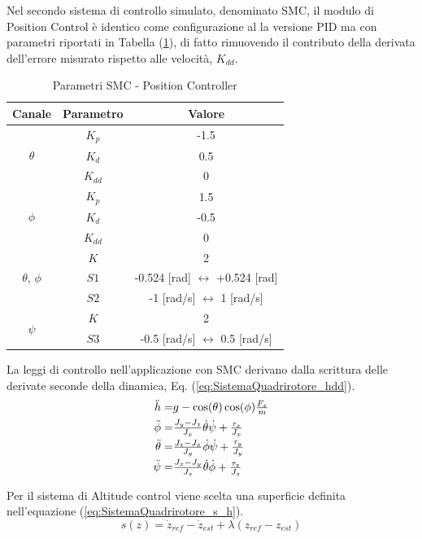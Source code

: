 Nel secondo sistema di controllo simulato, denominato SMC, il modulo di Position Control è identico come configurazione al la versione PID ma con parametri riportati in Tabella (\ref{tab:SMCPOS}), di fatto rimuovendo il contributo della derivata dell'errore misurato rispetto alle velocità, $K_{dd}$.

\begin{table}
	\centering
	\begin{tabular}{c c c}
		\hline
		Canale & Parametro & Valore \\
		\hline
		\multirow{3}{*}{$\theta$}&$K_p$ & -1.5 \\
		&$K_d$ & 0.5\\
		&$K_{dd}$ & 0\\
		\hline
		\multirow{3}{*}{$\phi$}& $K_p$ & 1.5 \\
		&$K_d$ & -0.5\\
		&$K_{dd}$ & 0\\
		\hline
		\multirow{3}{*}{$\theta$, $\phi$}&$K$ & 2 \\ 
		&$S1$ & -0.524 [rad] $\leftrightarrow$ +0.524 [rad]\\
		&$S2$ & -1 [rad/s] $\leftrightarrow$ 1  [rad/s]\\
		\hline
		\multirow{2}{*}{$\psi$}&$K$ & 2 \\
		&$S3$ & -0.5 [rad/s] $\leftrightarrow$ 0.5 [rad/s]\\
		\hline		
	\end{tabular}	
	\caption{Parametri SMC - Position Controller}
	\label{tab:SMCPOS}
\end{table}

La leggi di controllo nell'applicazione con SMC derivano dalla scrittura delle derivate seconde della dinamica, Eq. (\ref{eq:SistemaQuadrirotore_hdd}).
\begin{equation}\label{eq:SistemaQuadrirotore_hdd}
\begin{array}{r@{}l}
	\ddot{h} = & g -\cos(\theta)\cos(\phi)\frac{F_z}{m} \\[1ex]
	\ddot{\phi} = &\frac{J_y -J_z}{J_x} \dot{\theta} \dot{\psi} + \frac{\tau_x}{J_x} \\[1ex]
	\ddot{\theta}  = & \frac{J_z -J_x}{J_y} \dot{\phi} \dot{\psi} + \frac{\tau_y}{J_y} \\[1ex]
	\ddot{\psi}  = & \frac{J_x -J_y}{J_z} \dot{\theta} \dot{\phi} + \frac{\tau_z}{J_z} 
\end{array}
\end{equation}

Per il sistema di Altitude control viene scelta una superficie definita nell'equazione (\ref{eq:SistemaQuadrirotore_s_h}).
\begin{equation}\label{eq:SistemaQuadrirotore_s_h}
	s(z) = \dot{z}_{ref} - \dot{z}_{est} + \lambda (z_{ref} - z_{est})
\end{equation}

